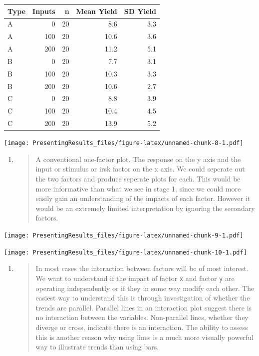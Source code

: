 \documentclass[
]{book}
\begin{document}
\begin{tabular}{l|r|r|r|r}
\hline
Type & Inputs & n & Mean Yield & SD Yield\\
\hline
A & 0 & 20 & 8.6 & 3.3\\
\hline
A & 100 & 20 & 10.6 & 3.6\\
\hline
A & 200 & 20 & 11.2 & 5.1\\
\hline
B & 0 & 20 & 7.7 & 3.1\\
\hline
B & 100 & 20 & 10.3 & 3.3\\
\hline
B & 200 & 20 & 10.6 & 2.7\\
\hline
C & 0 & 20 & 8.8 & 3.9\\
\hline
C & 100 & 20 & 10.4 & 4.5\\
\hline
C & 200 & 20 & 13.9 & 5.2\\
\hline
\end{tabular}

\texttt{[image: PresentingResults\_files/figure-latex/unnamed-chunk-8-1.pdf]}

\begin{enumerate}
\def\labelenumi{\arabic{enumi}.}
\setcounter{enumi}{1}
\item
  \begin{quote}
  A conventional one-factor plot. The response on the y axis and the input or stimulus or irsk factor on the x axis.
  We could seperate out the two factors and produce seperate plots for each. This would be more informative than what we see in stage 1, since we could more easily gain an understanding of the impacts of each factor. However it would be an extremely limited interpretation by ignoring the secondary factors.
  \end{quote}
\end{enumerate}

\texttt{[image: PresentingResults\_files/figure-latex/unnamed-chunk-9-1.pdf]}

\texttt{[image: PresentingResults\_files/figure-latex/unnamed-chunk-10-1.pdf]}

\begin{enumerate}
\def\labelenumi{\arabic{enumi}.}
\setcounter{enumi}{2}
\item
  \begin{quote}
  In most cases the interaction between factors will be of most interest. We want to understand if the impact of factor \texttt{x} and factor \texttt{y} are operating independently or if they in some way modify each other. The easiest way to understand this is through investigation of whether the trends are parallel. Parallel lines in an interaction plot suggest there is no interaction between the variables. Non-parallel lines, whether they diverge or cross, indicate there is an interaction. The ability to assess this is another reason why using lines is a much more visually powerful way to illustrate trends than using bars.
  \end{quote}
\end{enumerate}
\end{document}
